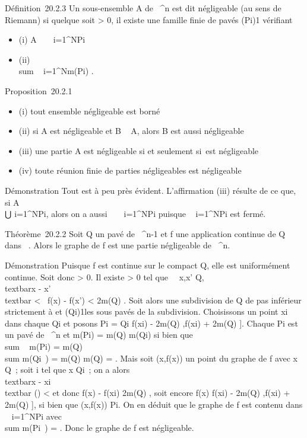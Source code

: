 Définition~20.2.3 Un sous-ensemble A de ~^n est dit
négligeable (au sens de Riemann) si quelque soit \epsilon \textgreater{} 0, il
existe une famille finie de pavés (Pi)1\leqi\leqN
vérifiant

\begin{itemize}
\itemsep1pt\parskip0pt
\item
  (i) A \subset~\⋃ ~
  i=1^NPi
\item
  (ii) \\sum ~
  i=1^Nm(Pi) \leq \epsilon.
\end{itemize}

Proposition~20.2.1

\begin{itemize}
\itemsep1pt\parskip0pt
\item
  (i) tout ensemble négligeable est borné
\item
  (ii) si A est négligeable et B \subset~ A, alors B est aussi négligeable
\item
  (iii) une partie A est négligeable si et seulement
  si~\overlineA est négligeable
\item
  (iv) toute réunion finie de parties négligeables est négligeable
\end{itemize}

Démonstration Tout est à peu près évident. L'affirmation (iii) résulte
de ce que, si A \subset~\\⋃
 i=1^NPi, alors on a aussi
\overlineA
\subset~\⋃ ~
i=1^NPi puisque
\⋃ ~
i=1^NPi est fermé.

Théorème~20.2.2 Soit Q un pavé de ~^n-1 et f une application
continue de Q dans ~. Alors le graphe de f est une partie négligeable de
~^n.

Démonstration Puisque f est continue sur le compact Q, elle est
uniformément continue. Soit donc \epsilon \textgreater{} 0. Il existe \eta
\textgreater{} 0 tel que \forall~~x,x' \in Q,
\\textbar{}x - x'\\textbar{} \textless{} \eta
\rigtharrow~\textbar{}f(x) - f(x')\textbar{} \textless{} \epsilon \over
2m(Q) . Soit alors \sigma une subdivision de Q de pas inférieur strictement
à \eta et (Qi)1\leqi\leqN les sous pavés de la subdivision.
Choisissons un point xi dans chaque Qi et posons
Pi = Qi \times {[}f(xi) - \epsilon
\over 2m(Q) ,f(xi) + \epsilon \over
2m(Q) {]}. Chaque Pi est un pavé de ~^n et
m(Pi) = \epsilon \over m(Q) m(Qi) si
bien que \\sum ~
m(Pi) = \epsilon \over m(Q)
 \\sum  m(Qi~)
= \epsilon \over m(Q) m(Q) = \epsilon. Mais soit (x,f(x)) un point
du graphe de f avec x \in Q~; soit i tel que x \in Qi~; on a alors
\\textbar{}x - xi\\textbar{} \leq
\delta(\sigma) \textless{} \eta et donc \textbar{}f(x) - f(xi)\textbar{}\leq
\epsilon \over 2m(Q) , soit encore f(x) \in {[}f(xi)
- \epsilon \over 2m(Q) ,f(xi) + \epsilon
\over 2m(Q) {]}, si bien que (x,f(x)) \in Pi.
On en déduit que le graphe de f est contenu dans
\⋃ ~
i=1^NPi avec
\\sum  m(Pi~) =
\epsilon. Donc le graphe de f est négligeable.

